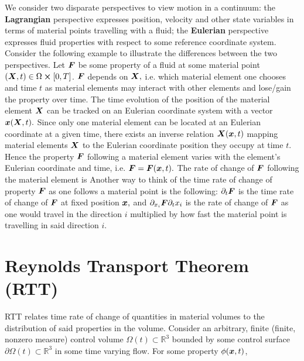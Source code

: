 We consider two disparate perspectives to view motion in a continuum: the \textbf{Lagrangian} perspective expresses position, velocity and other state variables in terms of material points travelling with a fluid; the \textbf{Eulerian} perspective expresses fluid properties with respect to some reference coordinate system. Consider the following example to illustrate the differences between the two perspectives. Let $\boldsymbol{F}$ be some property of a fluid at some material point $(\boldsymbol{X},t)\in\Omega\cross[0,T]$. $\boldsymbol{F}$ depends on $\boldsymbol{X},$ i.e. which material element one chooses and time $t$ as material elements may interact with other elements and lose/gain the property over time. The time evolution of the position of the material element $\boldsymbol{X}$ can be tracked on an Eulerian coordinate system with a vector $\boldsymbol{x}(\boldsymbol{X},t).$ Since only one material element can be located at an Eulerian coordinate at a given time, there exists an inverse relation $\boldsymbol{X}(\boldsymbol{x},t)$ mapping material elements $\boldsymbol{X}$ to the Eulerian coordinate position they occupy at time $t.$ Hence the property $\boldsymbol{F}$ following a material element varies with the element's Eulerian coordinate and time, i.e. $\boldsymbol{F}=\boldsymbol{F}(\boldsymbol{x},t).$ The rate of change of $\boldsymbol{F}$ following the material element is
Another way to think of the time rate of change of property $\boldsymbol{F}$ as one follows a material point is the following: $\partial_{t}\boldsymbol{F}$ is the time rate of change of $\boldsymbol{F}$ at fixed position $\boldsymbol{x},$ and $\partial_{x_i}\boldsymbol{F}\partial_t x_i$ is the rate of change of $\boldsymbol{F}$ as one would travel in the direction $i$ multiplied by how fast the material point is travelling in said direction $i.$
\section{Reynolds Transport Theorem (RTT)}
RTT relates time rate of change of quantities in material volumes to the distribution of said properties in the volume. Consider an arbitrary, finite (finite, nonzero measure) control volume $\Omega(t)\subset\mathbb{R}^3$ bounded by some control surface $\partial\Omega(t)\subset\mathbb{R}^3$ in some time varying flow.
For some property $\phi(\boldsymbol{x},t)$,

